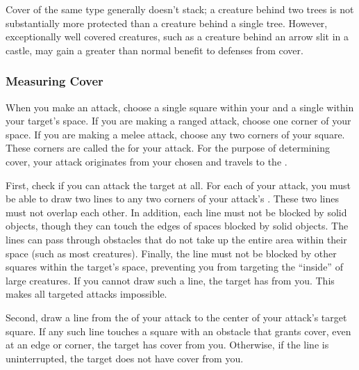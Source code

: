         Cover of the same type generally doesn't stack; a creature behind two trees is not substantially more protected than a creature behind a single tree.
        However, exceptionally well covered creatures, such as a creature behind an arrow slit in a castle, may gain a greater than normal benefit to defenses from cover.

        \subsubsection{Measuring Cover}

            When you make an attack, choose a single square within your  and a single  within your target's space.
            If you are making a ranged attack, choose one corner of your space.
            If you are making a melee attack, choose any two corners of your square.
            These corners are called the  for your attack.
            For the purpose of determining cover, your attack originates from your chosen  and travels to the .

            First, check if you can attack the target at all.
            For each  of your attack, you must be able to draw two lines to any two corners of your attack's .
            These two lines must not overlap each other.
            In addition, each line must not be blocked by solid objects, though they can touch the edges of spaces blocked by solid objects.
            The lines can pass through obstacles that do not take up the entire area within their space (such as most creatures).
            Finally, the line must not be blocked by other squares within the target's space, preventing you from targeting the ``inside'' of large creatures.
            If you cannot draw such a line, the target has  from you.
            This makes all targeted attacks impossible.

            Second, draw a line from the  of your attack to the center of your attack's target square.
            If any such line touches a square with an obstacle that grants cover, even at an edge or corner, the target has cover from you.
            Otherwise, if the line is uninterrupted, the target does not have cover from you.

